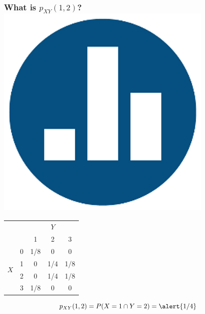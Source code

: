 \documentclass[handout]{beamer}
\begin{document}
\begin{frame}
\frametitle{What is $p_{XY}(1,2)$? \hfill \includegraphics[scale = 0.05]{./images/clicker}}

\begin{table}
\begin{tabular}{|cc|ccc|}
\hline
&&\multicolumn{3}{c|}{$Y$}\\
&&1 & 2&3\\
\hline
\multirow{4}{*}{$X$}
&0& \multicolumn{1}{|c}{\alert{1/8}} & \alert{0}& \alert{0}\\
&1& \multicolumn{1}{|c}{\alert{0}} & \alert{1/4}&\alert{1/8}\\
&2& \multicolumn{1}{|c}{\alert{0}} & \alert{1/4}&\alert{1/8}\\
&3& \multicolumn{1}{|c}{\alert{1/8}} & \alert{0}&\alert{0}\\
\hline
\end{tabular}
\end{table}

\pause



$$p_{XY}(1,2) =   P(X=1 \cap Y =2) =  \alert{1/4}$$

\end{frame}
\end{document}
